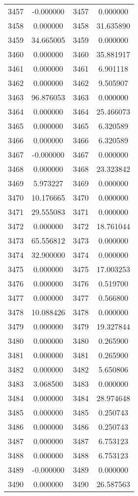 \documentclass[12pt]{article}
\begin{document}
\begin{longtable}{@{}cccc@{}}
3457 & -0.000000 & 3457 & 0.000000 \\
3458 & 0.000000 & 3458 & 31.635890 \\
3459 & 34.665005 & 3459 & 0.000000 \\
3460 & 0.000000 & 3460 & 35.881917 \\
3461 & 0.000000 & 3461 & 6.901118 \\
3462 & 0.000000 & 3462 & 9.505907 \\
3463 & 96.876053 & 3463 & 0.000000 \\
3464 & 0.000000 & 3464 & 25.466073 \\
3465 & 0.000000 & 3465 & 6.320589 \\
3466 & 0.000000 & 3466 & 6.320589 \\
3467 & -0.000000 & 3467 & 0.000000 \\
3468 & 0.000000 & 3468 & 23.323842 \\
3469 & 5.973227 & 3469 & 0.000000 \\
3470 & 10.176665 & 3470 & 0.000000 \\
3471 & 29.555083 & 3471 & 0.000000 \\
3472 & 0.000000 & 3472 & 18.761044 \\
3473 & 65.556812 & 3473 & 0.000000 \\
3474 & 32.900000 & 3474 & 0.000000 \\
3475 & 0.000000 & 3475 & 17.003253 \\
3476 & 0.000000 & 3476 & 0.519700 \\
3477 & 0.000000 & 3477 & 0.566800 \\
3478 & 10.088426 & 3478 & 0.000000 \\
3479 & 0.000000 & 3479 & 19.327844 \\
3480 & 0.000000 & 3480 & 0.265900 \\
3481 & 0.000000 & 3481 & 0.265900 \\
3482 & 0.000000 & 3482 & 5.650806 \\
3483 & 3.068500 & 3483 & 0.000000 \\
3484 & 0.000000 & 3484 & 28.974648 \\
3485 & 0.000000 & 3485 & 0.250743 \\
3486 & 0.000000 & 3486 & 0.250743 \\
3487 & 0.000000 & 3487 & 6.753123 \\
3488 & 0.000000 & 3488 & 6.753123 \\
3489 & -0.000000 & 3489 & 0.000000 \\
3490 & 0.000000 & 3490 & 26.587563 \\

\end{longtable}
\end{document}
